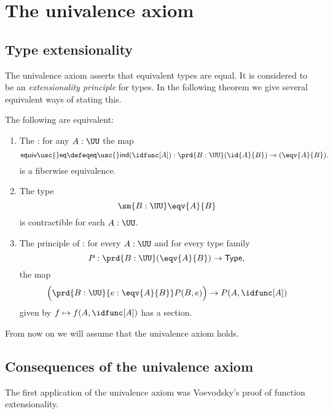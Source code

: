 \chapter{The univalence axiom}

\section{Type extensionality}

The univalence axiom asserts that equivalent types are equal. It is considered to be an \emph{extensionality principle} for types. In the following theorem we give several equivalent ways of stating this.

\begin{thm}\label{thm:univalence}
The following are equivalent:
\begin{enumerate}
\item The : for any $A:\UU$ the map
\begin{equation*}
\mathsf{equiv\usc{}eq}\defeq \mathsf{eq\usc{}ind}(\idfunc[A]) : \prd{B:\UU} (\id{A}{B})\to(\eqv{A}{B}).
\end{equation*}
is a fiberwise equivalence.
\item The type
\begin{equation*}
\sm{B:\UU}\eqv{A}{B}
\end{equation*}
is contractible for each $A:\UU$.
\item The principle of : for every $A:\UU$ and for every type family
\begin{equation*}
P:\prd{B:\UU} (\eqv{A}{B})\to \mathsf{Type},
\end{equation*}
the map
\begin{equation*}
\Big(\prd{B:\UU}{e:\eqv{A}{B}}P(B,e)\Big)\to P(A,\idfunc[A])
\end{equation*}
given by $f\mapsto f(A,\idfunc[A])$ has a section.
\end{enumerate}
\end{thm}

From now on we will assume that the univalence axiom holds.

\section{Consequences of the univalence axiom}

The first application of the univalence axiom was Voevodsky's proof of function extensionality.

